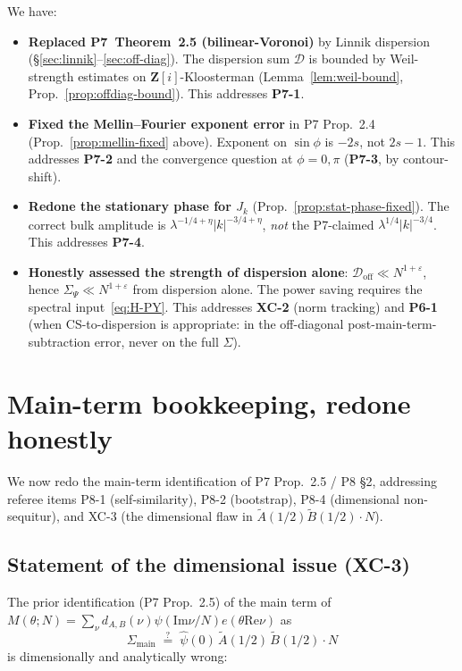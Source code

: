 \documentclass[11pt]{article}
\theoremstyle{definition}
\newcommand{\Z}{\mathbf{Z}}
\newcommand{\Zi}{\Z[i]}
\renewcommand{\Re}{\mathrm{Re}}
\renewcommand{\Im}{\mathrm{Im}}
\begin{document}
We have:
\begin{itemize}
\item \textbf{Replaced P7~Theorem~2.5 (bilinear-Voronoi)} by Linnik dispersion (\S\ref{sec:linnik}--\ref{sec:off-diag}). The dispersion sum $\mathcal{D}$ is bounded by Weil-strength estimates on $\Zi$-Kloosterman (Lemma~\ref{lem:weil-bound}, Prop.~\ref{prop:offdiag-bound}). This addresses \textbf{P7-1}.
\item \textbf{Fixed the Mellin--Fourier exponent error} in P7 Prop.\ 2.4 (Prop.~\ref{prop:mellin-fixed} above). Exponent on $\sin\phi$ is $-2s$, not $2s-1$. This addresses \textbf{P7-2} and the convergence question at $\phi=0,\pi$ (\textbf{P7-3}, by contour-shift).
\item \textbf{Redone the stationary phase for $J_k$} (Prop.~\ref{prop:stat-phase-fixed}). The correct bulk amplitude is $\lambda^{-1/4+\eta}|k|^{-3/4+\eta}$, \emph{not} the P7-claimed $\lambda^{1/4}|k|^{-3/4}$. This addresses \textbf{P7-4}.
\item \textbf{Honestly assessed the strength of dispersion alone}: $\mathcal{D}_{\mathrm{off}}\ll N^{1+\varepsilon}$, hence $\Sigma_\Psi\ll N^{1+\varepsilon}$ from dispersion alone. The power saving requires the spectral input~\eqref{eq:H-PY}. This addresses \textbf{XC-2} (norm tracking) and \textbf{P6-1} (when CS-to-dispersion is appropriate: in the off-diagonal post-main-term-subtraction error, never on the full $\Sigma$).
\end{itemize}

\section{Main-term bookkeeping, redone honestly}\label{sec:main-term}

We now redo the main-term identification of P7 Prop.\ 2.5 / P8 \S2, addressing referee items P8-1 (self-similarity), P8-2 (bootstrap), P8-4 (dimensional non-sequitur), and XC-3 (the dimensional flaw in $\widetilde A(1/2)\widetilde B(1/2)\cdot N$).

\subsection{Statement of the dimensional issue (XC-3)}\label{sec:xc3-dim}

The prior identification (P7 Prop.\ 2.5) of the main term of $M(\theta;N)=\sum_\nu d_{A,B}(\nu)\psi(\Im\nu/N)e(\theta\Re\nu)$ as
\[
\Sigma_{\mathrm{main}}\;\stackrel{?}{=}\;\widehat\psi(0)\,\widetilde A(1/2)\,\widetilde B(1/2)\cdot N
\]
is dimensionally and analytically wrong:
\end{document}
